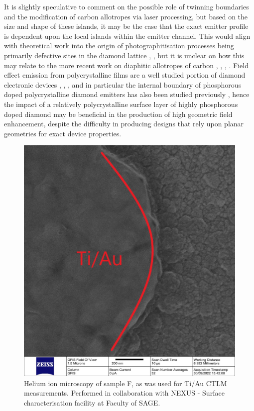 \begin{refsection}
It is slightly speculative to comment on the possible role of twinning boundaries and the modification of carbon allotropes via laser processing, but based on the size and shape of these islands, it may be the case that the exact emitter profile is dependent upon the local islands within the emitter channel. This would align with theoretical work into the origin of photographitisation processes being primarily defective sites in the diamond lattice \cite{Kononenko2009}, \cite{kononenko:2015}, but it is unclear on how this may relate to the more recent work on diaphitic allotropes of carbon \cite{salter2024}, \cite{Nemeth2020}, \cite{Nemeth20202}, \cite{Nemeth2021}. Field effect emission from polycrystalline films are a well studied portion of diamond electronic devices \cite{Sugino1998}, \cite{Watanabe2001}, \cite{Watanabe2003}, and in particular the internal boundary of phosphorous doped polycrystalline diamond emitters has also been studied previously \cite{Sugino19982}, hence the impact of a relatively polycrystalline surface layer of highly phosphorous doped diamond may be beneficial in the production of high geometric field enhancement, despite the difficulty in producing designs that rely upon planar geometries for exact device properties.

\begin{figure}[H]
    \centering
    \includegraphics[width=\linewidth]{Chapter7/Figs/Raster/him 007 A.6.jpg}
    \caption{Helium ion microscopy of sample F, as was used for Ti/Au CTLM measurements. Performed in collaboration with NEXUS - Surface characterisation facility at Faculty of SAGE.}
    \label{fig:him_2}
\end{figure}


\end{refsection}
